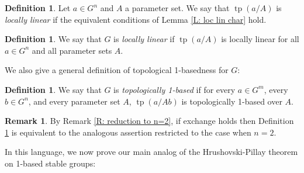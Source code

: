 \documentclass{amsart}
\theoremstyle{definition}
\newtheorem{definition}[theorem]{Definition}
\newtheorem{remark}[theorem]{Remark}
\newcommand{\tp}{\operatorname{tp}}
\begin{document}
    \begin{definition}
        Let $a\in G^n$ and $A$ a parameter set. We say that $\tp(a/A)$ is \textit{locally linear} if the equivalent conditions of Lemma \ref{L: loc lin char} hold. 
    \end{definition}

    \begin{definition}
        We say that $G$ is \textit{locally linear} if $\tp(a/A)$ is locally linear for all $a\in G^n$ and all parameter sets $A$.
    \end{definition}

    We also give a general definition of topological 1-basedness for $G$:

    \begin{definition}\label{D: 1-based group}
    We say that $G$ is \textit{topologically 1-based} if for every $a\in G^m$, every $b\in G^n$, and every parameter set $A$, $\tp(a/Ab)$ is topologically 1-based over $A$.
\end{definition}

\begin{remark}\label{R: loc mod gp} By Remark \ref{R: reduction to n=2}, if exchange holds then Definition \ref{D: 1-based group} is equivalent to the analogous assertion restricted to the case when $n=2$.
\end{remark}

In this language, we now prove our main analog of the Hrushovski-Pillay theorem on 1-based stable groups:
\end{document}
